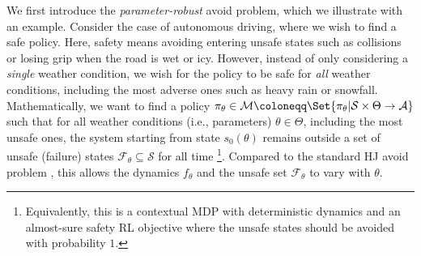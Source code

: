 \documentclass{article} %
\newcommand*{\AvoidSet}{{\mathcal{F}_\theta}}
\newcommand*{\XSet}{\mathcal{X}}
\newcommand*{\USet}{\mathcal{U}}
\def\XSet{{\mathcal{S}}}
\def\USet{{\mathcal{A}}}
\begin{document}
We first introduce the \textit{parameter-robust} avoid problem, which we illustrate with an example.
Consider the case of autonomous driving, where we wish to find a safe policy.
Here, safety means avoiding entering unsafe states such as collisions or losing grip when the road is wet or icy.
However, instead of only considering a \textit{single} weather condition, we wish for the policy to be safe for
\textit{all} weather conditions, including the most adverse ones such as heavy rain or snowfall.
Mathematically, we want to find a policy $\pi_\theta \in \mathcal{M} \coloneqq \Set{ \pi_\theta | \XSet \times \Theta \to \USet }$ such that for all weather conditions (i.e., parameters) $\theta \in \Theta$, including the most unsafe ones, the system starting from state $s_0(\theta)$ remains outside a set of unsafe (failure) states $\AvoidSet \subseteq \XSet$ for all time \footnote{Equivalently, this is a contextual MDP \citep{hallak2015contextual} with deterministic dynamics and an almost-sure safety RL objective \citep{sootla2022saute} where the unsafe states should be avoided with probability $1$.}.
Compared to the standard HJ avoid problem \citep{mitchell2005time}, this allows the dynamics $f_\theta$ and the unsafe set $\AvoidSet$ to vary with $\theta$.
\end{document}
